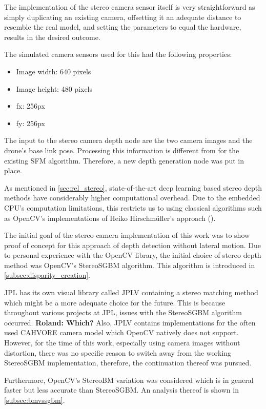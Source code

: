 The implementation of the stereo camera sensor itself is very straightforward as simply duplicating an existing camera, offsetting it an adequate distance to resemble the real model, and setting the parameters to equal the hardware, results in the desired outcome.

The simulated camera sensors used for this had the following properties:

\begin{itemize}
    \item Image width: 640 pixels
    \item Image height: 480 pixels
    \item fx: 256px
    \item fy: 256px
\end{itemize}

The input to the stereo camera depth node are the two camera images and the drone's base link pose. Processing this information is different from for the existing SFM algorithm. Therefore, a new depth generation node was put in place. 

As mentioned in \cref{sec:rel_stereo}, state-of-the-art deep learning based stereo depth methods have considerably higher computational overhead. Due to the embedded CPU's computation limitations, this restricts us to using classical algorithms such as OpenCV's implementations of Heiko Hirschmüller's approach (\citep{Stereo}).

The initial goal of the stereo camera implementation of this work was to show proof of concept for this approach of depth detection without lateral motion. Due to personal experience with the OpenCV library, the initial choice of stereo depth method was OpenCV's StereoSGBM algorithm. This algorithm is introduced in \cref{subsec:disparity_creation}.

JPL has its own visual library called JPLV containing a stereo matching method which might be a more adequate choice for the future. This is because throughout various projects at JPL, issues with the StereoSGBM algorithm occurred. \textbf{\@ Roland: Which?}
Also, JPLV contains implementations for the often used CAHVORE camera model which OpenCV natively does not support. However, for the time of this work, especially using camera images without distortion, there was no specific reason to switch away from the working StereoSGBM implementation, therefore, the continuation thereof was pursued.

Furthermore, OpenCV's StereoBM variation was considered which is in general faster but less accurate than StereoSGBM. An analysis thereof is shown in \cref{subsec:bmvssgbm}.


